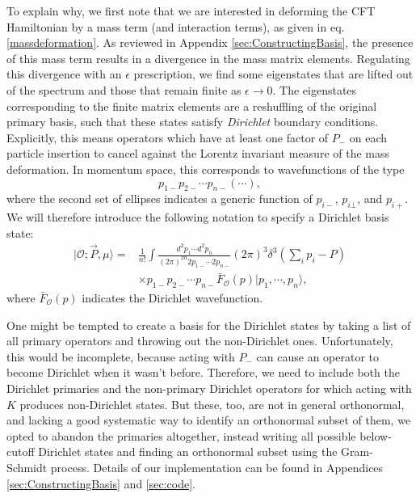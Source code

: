 To explain why, we first note that we are interested in deforming the CFT 
Hamiltonian by a mass term (and interaction terms), as given in eq. 
\eqref{massdeformation}. As reviewed in Appendix \ref{sec:ConstructingBasis}, 
the presence of this mass term results in a divergence in the mass matrix 
elements. Regulating this divergence with an $\epsilon$ prescription, we find 
some eigenstates that are lifted out of the spectrum and those that remain 
finite as $\epsilon \to 0$. The eigenstates corresponding to the finite matrix 
elements are a reshuffling of the original primary basis, such that these states 
satisfy \textit{Dirichlet} boundary conditions. Explicitly, this means operators 
which have at least one factor of $P_-$ on each particle insertion to cancel 
against the Lorentz invariant measure of the mass deformation. In momentum 
space, this corresponds to wavefunctions of the type 
\begin{equation}{}
    p_{1-} p_{2-} \dotsb p_{n-} \left( \dotsb \right),
\end{equation} 
where the second set of ellipses indicates a generic function of 
$p_{i-}$, $p_{i\bot}$, and $p_{i+}$. We will therefore introduce the following 
notation to specify a Dirichlet basis state: 
\begin{equation}
    \begin{aligned}
        | \mathcal{O}; \vec{P}, \mu \rangle = &\frac{1}{n!}\int \frac{d^2 p_1 \dotsb d^2 p_n}{(2\pi)^{2n} 2p_{1-} \dotsb 2p_{n-}} (2\pi)^3 \delta^3 \left( \sum_i p_i - P \right) \\
        &\times p_{1-} p_{2-} \dotsb p_{n-} \bar{F}_{\mathcal{O}}(p) | p_1, \dotsb, p_n \rangle,
    \end{aligned}
\end{equation} 
where $\bar{F}_{\mathcal{O}}(p)$ indicates the Dirichlet wavefunction.

One might be tempted to create a basis for the Dirichlet states by taking a list
of all primary operators and throwing out the non-Dirichlet ones. Unfortunately,
this would be incomplete, because acting with $P_-$ can cause an operator to
become Dirichlet when it wasn't before. Therefore, we need to include both the
Dirichlet primaries and the non-primary Dirichlet operators for which acting
with $K$ produces non-Dirichlet states. But these, too, are not in general 
orthonormal, and lacking a good systematic way to identify an orthonormal 
subset of them, we opted to abandon the primaries altogether, instead writing
all possible below-cutoff Dirichlet states and finding an orthonormal subset
using the Gram-Schmidt process. Details of our implementation can be found in 
Appendices \ref{sec:ConstructingBasis} and \ref{sec:code}.

